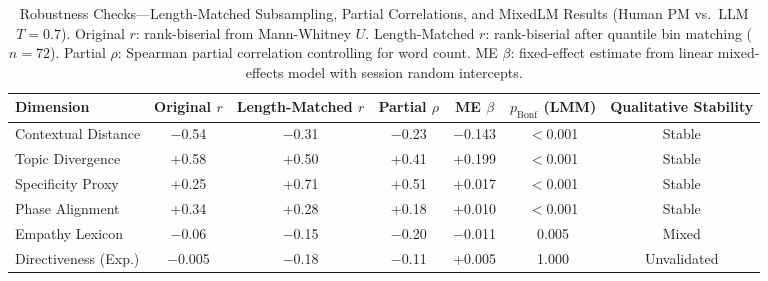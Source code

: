 \documentclass[preprint,12pt,authoryear]{elsarticle}
\begin{document}
\begin{table}[h]
\centering
\caption{Robustness Checks---Length-Matched Subsampling, Partial Correlations, and MixedLM Results (Human PM vs.\ LLM $T=0.7$). Original $r$: rank-biserial from Mann-Whitney $U$. Length-Matched $r$: rank-biserial after quantile bin matching ($n = 72$). Partial $\rho$: Spearman partial correlation controlling for word count. ME $\beta$: fixed-effect estimate from linear mixed-effects model with session random intercepts.}
\label{tab:robustness}
\small
\begin{tabular}{lcccccc}
\toprule
\textbf{Dimension} & \textbf{Original $r$} & \textbf{Length-Matched $r$} & \textbf{Partial $\rho$} & \textbf{ME $\beta$} & \textbf{$p_{\text{Bonf}}$ (LMM)} & \textbf{Qualitative Stability} \\
\midrule
Contextual Distance  & $-$0.54 & $-$0.31 & $-$0.23 & $-$0.143 & $<$0.001 & Stable \\
Topic Divergence     & +0.58   & +0.50   & +0.41   & +0.199   & $<$0.001 & Stable \\
Specificity Proxy    & +0.25   & +0.71   & +0.51   & +0.017   & $<$0.001 & Stable \\
Phase Alignment      & +0.34   & +0.28   & +0.18   & +0.010   & $<$0.001 & Stable \\
Empathy Lexicon      & $-$0.06 & $-$0.15 & $-$0.20 & $-$0.011 & 0.005    & Mixed  \\
Directiveness (Exp.) & $-$0.005 & $-$0.18 & $-$0.11 & +0.005  & 1.000    & Unvalidated \\
\bottomrule
\end{tabular}
\end{table}
\end{document}

